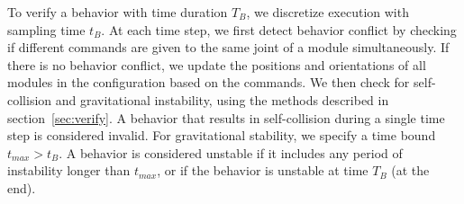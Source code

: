 \documentclass[graybox]{svmult}
\begin{document}
% 

To verify a behavior with time duration  $T_B$, we discretize execution with sampling time $t_B$. At each time step, we first detect behavior conflict by checking if different commands are given to the same joint of a module simultaneously. If there is no behavior conflict, we update the positions and orientations of all modules in the configuration based on the commands. We then check for self-collision and gravitational instability, using the methods described in section~\ref{sec:verify}.  
A behavior that results in self-collision during a single time step is considered
invalid. For gravitational stability, we specify a time bound
\(t_{max} > t_B\). A behavior is considered unstable if it
includes any period of instability longer than \(t_{max}\), or if the behavior is unstable at time \(T_B\) (at the end).
\end{document}
